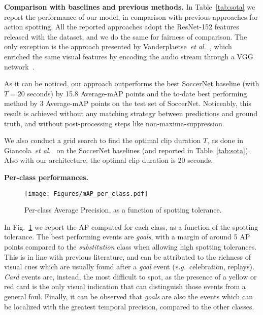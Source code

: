 \documentclass[a4paper,conference]{IEEEtran}
\newcommand{\tit}[1]{\smallbreak\noindent\textbf{#1.}}
\def \eg {\emph{e.g.}}
\def \etal {\emph{et al.}}
\begin{document}
\tit{Comparison with baselines and previous methods}
In Table~\ref{tab:sota} we report the performance of our model, in comparison with previous approaches for action spotting. All the reported approaches adopt the ResNet-152 features released with the dataset, and we do the same for fairness of comparison. The only exception is the approach presented by Vanderplaetse~\etal~\cite{vanderplaetse2020improved}, which enriched the same visual features by encoding the audio stream through a VGG network~\cite{simonyan2014very}.

As it can be noticed, our approach outperforms the best SoccerNet baseline (with $T=20$ seconds) by 15.8 Average-mAP points and the to-date best performing method by 3 Average-mAP points on the test set of SoccerNet. Noticeably, this result is achieved without any matching strategy between predictions and ground truth, and without post-processing steps like non-maxima-suppression. 

We also conduct a grid search to find the optimal clip duration $T$, as done in Giancola~\etal~\cite{giancola2018soccernet} on the SoccerNet baselines (and reported in Table~\ref{tab:sota}). Also with our architecture, the optimal clip duration is 20 seconds.

\tit{Per-class performances}
\begin{figure}[t]
\centering
\texttt{[image: Figures/mAP\_per\_class.pdf]}
\caption{Per-class Average Precision, as a function of spotting tolerance.}
\label{fig:mAP_per_class}
\end{figure}
In Fig.~\ref{fig:mAP_per_class} we report the AP computed for each class, as a function of the spotting tolerance. The best performing events are \textit{goals}, with a margin of around 5 AP points compared to the \textit{substitution} class when allowing high spotting tolerances. This is in line with previous literature, and can be attributed to the richness of visual cues which are usually found after a \textit{goal} event (\eg~celebration, replays). \textit{Card} events are, instead, the most difficult to spot, as the presence of a yellow or red card is the only visual indication that can distinguish those events from a general foul. Finally, it can be observed that \textit{goals} are also the events which can be localized with the greatest temporal precision, compared to the other classes.
\end{document}
